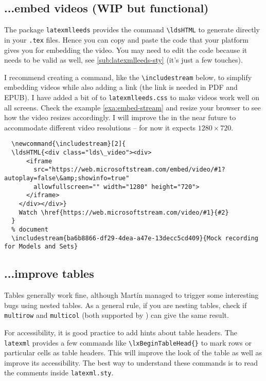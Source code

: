 \documentclass[a4paper]{article}
\def\ltxinline{\lstinline[style=latexml]}
\theoremstyle{definition}
\begin{document}
\subsection{...embed videos (WIP but functional)}
The package \verb|latexmlleeds| provides the command \ltxinline|\ldsHTML| to generate \HTML{} directly in your \verb|.tex| files. Hence you can copy and paste the \HTML{} code that your platform gives you for embedding the video. You may need to edit the \HTML{} code because it needs to be valid \XML{} as well, see \autoref{sub:latexmlleeds-sty} (it's just a few touches).

I recommend creating a command, like the \ltxinline|\includestream| below, to simplify embedding videos while also adding a link (the link is needed in PDF and EPUB). I have added a bit of \CSS{} to \verb|latexmlleeds.css| to make videos work well on all screens. Check the example \autoref{exa:embed-stream} and resize your browser to see how the video resizes accordingly. I will improve the \CSS{} in the near future to accommodate different video resolutions -- for now it expects $1280 \times 720$.
\begin{lstlisting}[style=latexml]
  % preamble
  \newcommand{\includestream}[2]{
  \ldsHTML{<div class="lds\_video"><div>
      <iframe
        src="https://web.microsoftstream.com/embed/video/#1?autoplay=false\&amp;showinfo=true"
        allowfullscreen="" width="1280" height="720">
      </iframe>
    </div></div>}
    Watch \href{https://web.microsoftstream.com/video/#1}{#2}
  }
  % document
  \includestream{ba6b8866-df29-4dea-a47e-13decc5cd409}{Mock recording for Models and Sets}
\end{lstlisting}

\subsection{...improve tables}
Tables generally work fine, although Mart\'in managed to trigger some interesting bugs using nested tables. As a general rule, if you are nesting tables, check if \verb|multirow| and \verb|multicol| (both supported by \LaTeXML{}) can give the same result.

  For accessibility, it is good practice to add hints about table headers. The \verb|latexml| provides a few commands like \ltxinline|\lxBeginTableHead{}| to mark rows or particular cells as table headers. This will improve the look of the \HTML{} table as well as improve its accessibility. The best way to understand these commands is to read the comments inside \verb|latexml.sty|.
\end{document}
